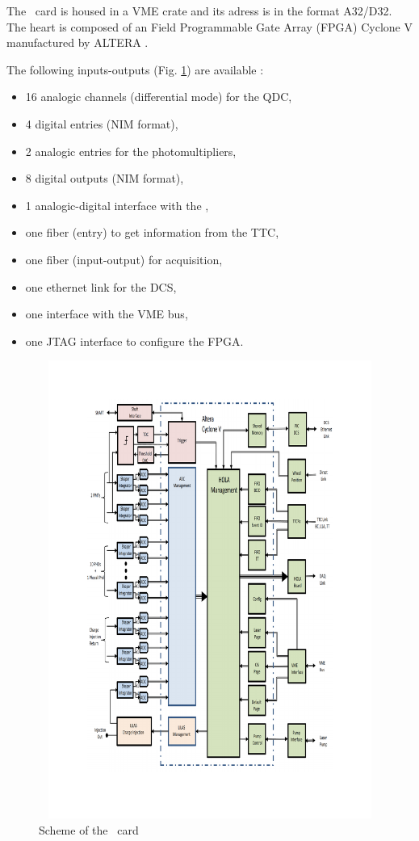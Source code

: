 The \lascar~card is housed in a VME crate and its adress is in the format A32/D32. The heart is composed of an Field Programmable Gate Array (FPGA) Cyclone V manufactured by ALTERA \cite{ref:altera-cyclone}.

The following inputs-outputs (Fig. \ref{fig:laslascarlinks}) are available :
\begin{itemize}
\item 16 analogic channels (differential mode) for the QDC,
\item 4 digital entries (NIM format),
\item 2 analogic entries for the photomultipliers,
\item 8 digital outputs (NIM format),
\item 1 analogic-digital interface with the \las,
\item one fiber (entry) to get information from the TTC,
\item one fiber (input-output) for acquisition,
\item one ethernet link for the DCS,
\item one interface with the VME bus,
\item one JTAG interface to configure the FPGA.

\end{itemize}

\begin{figure}[htbp]

\centering
\includegraphics[height=15cm,width=15cm]{figures/Lascarlinks.pdf}
\caption{Scheme of the \lascar~card}\label{fig:laslascarlinks}
\end{figure}


